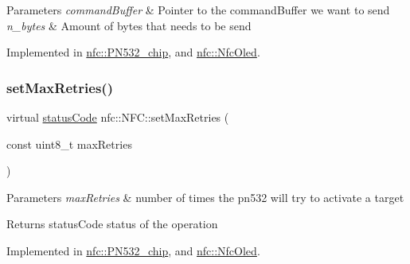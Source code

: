 \begin{DoxyParams}{Parameters}
{\em command\+Buffer} & Pointer to the command\+Buffer we want to send \\
\hline
{\em n\+\_\+bytes} & Amount of bytes that needs to be send \\
\hline
\end{DoxyParams}


Implemented in \hyperlink{classnfc_1_1PN532__chip_aab53fb1c9fced99ce154ab035f795302}{nfc\+::\+P\+N532\+\_\+chip}, and \hyperlink{classnfc_1_1NfcOled_aa969ac754435a695ce1ddb8c4285e76c}{nfc\+::\+Nfc\+Oled}.

\mbox{\label{classnfc_1_1NFC_a9dd84363c873a5d00c7edce644706bc0}} 
\subsubsection{\texorpdfstring{set\+Max\+Retries()}{setMaxRetries()}}
{\footnotesize\ttfamily virtual \hyperlink{declarations_8h_ae1d20c5a38cae82ccaa6a77be3fd264b}{status\+Code} nfc\+::\+N\+F\+C\+::set\+Max\+Retries (\begin{DoxyParamCaption}\item[{const uint8\+\_\+t}]{max\+Retries }\end{DoxyParamCaption})\hspace{0.3cm}{\ttfamily [pure virtual]}}


\begin{DoxyParams}{Parameters}
{\em max\+Retries} & number of times the pn532 will try to activate a target \\
\hline
\end{DoxyParams}
\begin{DoxyReturn}{Returns}
status\+Code status of the operation 
\end{DoxyReturn}


Implemented in \hyperlink{classnfc_1_1PN532__chip_ae418a2f5fc2d4d344264fe2ec549f912}{nfc\+::\+P\+N532\+\_\+chip}, and \hyperlink{classnfc_1_1NfcOled_a1c64d60d6008551a530d668acbdb5ede}{nfc\+::\+Nfc\+Oled}.

\mbox{\label{classnfc_1_1NFC_a1657b79a7ca710e01cf053ab269949ba}} 
